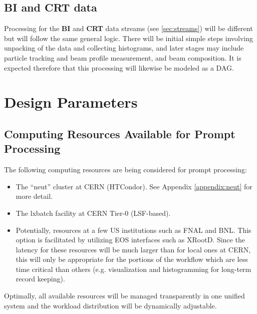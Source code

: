 \documentclass[pdftex,12pt,letter]{article}
\newcommand{\PP}{Prompt Processing\xspace}
\begin{document}
\subsection{BI and CRT data}
Processing for the \textbf{BI} and \textbf{CRT} data streams (see \ref{sec:streams}) will be different but will
follow the same general logic. There will be initial simple steps involving unpacking of the data and collecting
histograms, and later stages may include particle tracking and beam profile measurement, and beam
composition. It is expected therefore that this processing will likewise be modeled as a DAG.


\section{Design Parameters}
\label{sec:parameters}

\subsection{Computing Resources Available for \PP}
\label{resources}
The following computing resources are being considered for prompt processing:
\begin{itemize}

\item The ``neut'' cluster  \cite{neut} at CERN (HTCondor). See Appendix \ref{appendix:neut} for
more detail.

\item The lxbatch facility \cite{lxbatch} at CERN Tier-0 (LSF-based).

\item Potentially, resources at a few US institutions such as FNAL and BNL.  This option is facilitated
by utilizing EOS interfaces such as XRootD. Since the latency for these resources will be much larger
than for local ones at CERN, this will only be appropriate for the portions of the workflow which
are less time critical than others (e.g. visualization and histogramming for long-term record keeping).

\end{itemize}

\noindent Optimally, all available resources will be managed transparently in one unified system and
the workload distribution will be dynamically adjustable.
\end{document}
